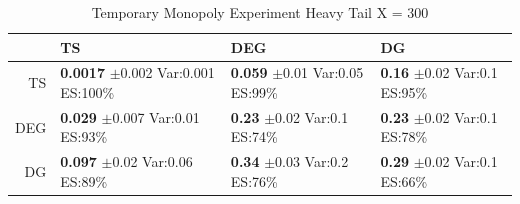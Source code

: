 \documentclass[11pt,letterpaper]{article}
\begin{document}
\begin{table}[H]
\centering
\caption{Temporary Monopoly Experiment Heavy Tail X = 300} 
\begin{tabular}{rlll}
  \hline
 & TS & DEG &  DG \\ 
  \hline
TS & \makecell{\textbf{0.0017} $\pm$0.002\\Var:0.001\\ES:100\%} & \makecell{\textbf{0.059} $\pm$0.01\\Var:0.05\\ES:99\%} & \makecell{\textbf{0.16} $\pm$0.02\\Var:0.1\\ES:95\%} \\ 
  DEG & \makecell{\textbf{0.029} $\pm$0.007\\Var:0.01\\ES:93\%} & \makecell{\textbf{0.23} $\pm$0.02\\Var:0.1\\ES:74\%} & \makecell{\textbf{0.23} $\pm$0.02\\Var:0.1\\ES:78\%} \\ 
   DG & \makecell{\textbf{0.097} $\pm$0.02\\Var:0.06\\ES:89\%} & \makecell{\textbf{0.34} $\pm$0.03\\Var:0.2\\ES:76\%} & \makecell{\textbf{0.29} $\pm$0.02\\Var:0.1\\ES:66\%} \\ 
   \hline
\end{tabular}
\end{table}
\end{document}
